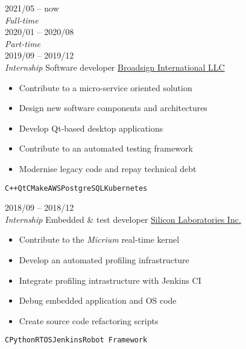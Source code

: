 \documentclass[9pt]{developercv} %
\begin{document}
\begin{minipage}[t]{0.8\textwidth}

\begin{entrylist}
	\entry
		{2021/05 -- now\\{\small\emph{Full-time}}\\2020/01 -- 2020/08\\{\small\emph{Part-time}}\\2019/09 -- 2019/12\\{\small\emph{Internship}}}
		{Software developer}
		{\href{https://broadsign.com/}{Broadsign International LLC}}
		{
			\vspace{-14pt}
			\begin{itemize}
				\renewcommand{\labelitemi}{\raisebox{.45ex}{\rule{.6ex}{.6ex}}}
				\setlength\itemsep{-1pt}
				\item Contribute to a micro-service oriented solution
				\item Design new software components and architectures
				\item Develop Qt-based desktop applications
				\item Contribute to an automated testing framework
				\item Modernise legacy code and repay technical debt
			\end{itemize}
			\vspace{-4pt}
			\texttt{C++}\slashsep\texttt{Qt}\slashsep\texttt{CMake}\slashsep\texttt{AWS}\slashsep\texttt{PostgreSQL}\slashsep\texttt{Kubernetes}
		}
	\entry
		{2018/09 -- 2018/12\\{\small\emph{Internship}}}
		{Embedded \& test developer}
		{\href{https://www.silabs.com/}{Silicon Laboratories Inc.}}
		{
			\vspace{-14pt}
			\begin{itemize}
				\renewcommand{\labelitemi}{\raisebox{.45ex}{\rule{.6ex}{.6ex}}}
				\setlength\itemsep{-1pt}
				\item Contribute to the \emph{Micrium} real-time kernel
				\item Develop an automated profiling infrastructure
				\item Integrate profiling intrastructure with Jenkins CI
				\item Debug embedded application and OS code
				\item Create source code refactoring scripts
			\end{itemize}
			\vspace{-4pt}
			\texttt{C}\slashsep\texttt{Python}\slashsep\texttt{RTOS}\slashsep\texttt{Jenkins}\slashsep\texttt{Robot Framework}
}
\end{entrylist}
\end{minipage}
\end{document}
